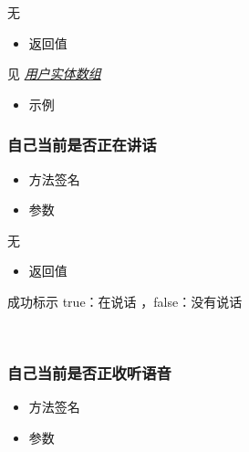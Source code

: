 \documentclass[letterpaper,10pt,english]{sphinxmanual}
\begin{document}
无
\begin{itemize}
\item {} 
返回值

\end{itemize}

见 {\hyperref[\detokenize{csharp:user}]{\emph{用户实体数组}}}
\begin{itemize}
\item {} 
示例

\end{itemize}


\subsubsection{自己当前是否正在讲话}
\label{\detokenize{csharp:id52}}\begin{itemize}
\item {} 
方法签名

\end{itemize}

%
\begin{sphinxVerbatim}[commandchars=\\\{\}]
  
\end{sphinxVerbatim}
\begin{itemize}
\item {} 
参数

\end{itemize}

无
\begin{itemize}
\item {} 
返回值

\end{itemize}

成功标示 true：在说话 ，false：没有说话

​


\subsubsection{自己当前是否正收听语音}
\label{\detokenize{csharp:id53}}\begin{itemize}
\item {} 
方法签名

\end{itemize}

%
\begin{sphinxVerbatim}[commandchars=\\\{\}]
  
\end{sphinxVerbatim}
\begin{itemize}
\item {} 
参数

\end{itemize}
\end{document}
